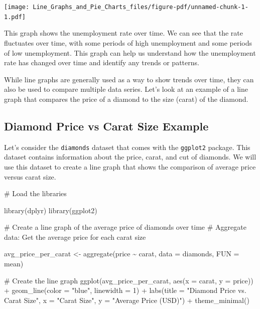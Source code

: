 \documentclass[
  letterpaper,
  DIV=11,
  numbers=noendperiod]{scrreprt}
\newenvironment{Shaded}{\begin{snugshade}}{\end{snugshade}}
\newcommand{\AttributeTok}[1]{\textcolor[rgb]{0.40,0.45,0.13}{#1}}
\newcommand{\CommentTok}[1]{\textcolor[rgb]{0.37,0.37,0.37}{#1}}
\newcommand{\DecValTok}[1]{\textcolor[rgb]{0.68,0.00,0.00}{#1}}
\newcommand{\FunctionTok}[1]{\textcolor[rgb]{0.28,0.35,0.67}{#1}}
\newcommand{\NormalTok}[1]{\textcolor[rgb]{0.00,0.23,0.31}{#1}}
\newcommand{\OtherTok}[1]{\textcolor[rgb]{0.00,0.23,0.31}{#1}}
\newcommand{\SpecialCharTok}[1]{\textcolor[rgb]{0.37,0.37,0.37}{#1}}
\newcommand{\StringTok}[1]{\textcolor[rgb]{0.13,0.47,0.30}{#1}}
\begin{document}
\texttt{[image: Line\_Graphs\_and\_Pie\_Charts\_files/figure-pdf/unnamed-chunk-1-1.pdf]}

This graph shows the unemployment rate over time. We can see that the
rate fluctuates over time, with some periods of high unemployment and
some periods of low unemployment. This graph can help us understand how
the unemployment rate has changed over time and identify any trends or
patterns.

While line graphs are generally used as a way to show trends over time,
they can also be used to compare multiple data series. Let's look at an
example of a line graph that compares the price of a diamond to the size
(carat) of the diamond.

\subsection*{Diamond Price vs Carat Size
Example}\label{diamond-price-vs-carat-size-example}

Let's consider the \texttt{diamonds} dataset that comes with the
\texttt{ggplot2} package. This dataset contains information about the
price, carat, and cut of diamonds. We will use this dataset to create a
line graph that shows the comparison of average price versus carat size.

\begin{Shaded}
\begin{Highlighting}[]
\CommentTok{\# Load the libraries}

\FunctionTok{library}\NormalTok{(dplyr)}
\FunctionTok{library}\NormalTok{(ggplot2)}

\CommentTok{\# Create a line graph of the average price of diamonds over time}
\CommentTok{\# Aggregate data: Get the average price for each carat size}

\NormalTok{avg\_price\_per\_carat }\OtherTok{\textless{}{-}} \FunctionTok{aggregate}\NormalTok{(price }\SpecialCharTok{\textasciitilde{}}\NormalTok{ carat, }\AttributeTok{data =}\NormalTok{ diamonds, }\AttributeTok{FUN =}\NormalTok{ mean)}

\CommentTok{\# Create the line graph}
\FunctionTok{ggplot}\NormalTok{(avg\_price\_per\_carat, }\FunctionTok{aes}\NormalTok{(}\AttributeTok{x =}\NormalTok{ carat, }\AttributeTok{y =}\NormalTok{ price)) }\SpecialCharTok{+}
  \FunctionTok{geom\_line}\NormalTok{(}\AttributeTok{color =} \StringTok{"blue"}\NormalTok{, }\AttributeTok{linewidth =} \DecValTok{1}\NormalTok{) }\SpecialCharTok{+} 
  \FunctionTok{labs}\NormalTok{(}\AttributeTok{title =} \StringTok{"Diamond Price vs. Carat Size"}\NormalTok{,}
       \AttributeTok{x =} \StringTok{"Carat Size"}\NormalTok{,}
       \AttributeTok{y =} \StringTok{"Average Price (USD)"}\NormalTok{) }\SpecialCharTok{+}
  \FunctionTok{theme\_minimal}\NormalTok{()}
\end{Highlighting}
\end{Shaded}
\end{document}
